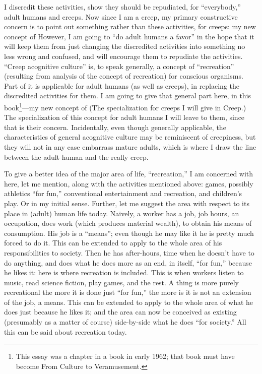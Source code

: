 I discredit these activities, show they should be repudiated, for \enquote{everybody,} adult humans and creeps. Now since I am a creep, my primary constructive concern is to point out something rather than these activities, for creeps: my new concept of  However, I am going to \enquote{do adult humans a favor} in the hope that it will keep them from just changing the discredited activities into something no less wrong and confused, and will encourage them to repudiate the activities. \enquote{Creep acognitive culture} is, to speak generally, a concept of \enquote{recreation} (resulting from analysis of the concept of recreation) for conscious organisms. Part of it is applicable for adult humans (as well as creeps), in replacing the discredited activities for them. I am going to give that general part here, in this book\footnote{This essay was a chapter in a book in early 1962; that book must have become From Culture to Veramusement.}---my new concept of  (The specialization for creeps I will give in Creep.) The specialization of this concept for adult humans I will leave to them, since that is their concern. Incidentally, even though generally applicable, the characteristics of general acognitive culture may be reminiscent of creepiness, but they will not in any case embarrass mature adults, which is where I draw the line between the adult human and the really creep.

To give a better idea of the major area of life, \enquote{recreation,} I am concerned with here, let me mention, along with the activities mentioned above: games, possibly athletics \enquote{for fun,} conventional entertainment and recreation, and children's play. Or  in my initial sense. Further, let me suggest the area with respect to its place in (adult) human life today. Naively, a worker has a job, job hours, an occupation, does work (which produces material wealth), to obtain his means of consumption. His job is a \enquote{means}; even though he may like it he is pretty much forced to do it. This can be extended to apply to the whole area of his responsibilities to society. Then he has after-hours, time when he doesn't have to do anything, and does what he does more as an end, in itself, \enquote{for fun,} because he likes it: here is where recreation is included. This is when workers listen to music, read science fiction, play games, and the rest. A thing is more purely recreational the more it is done just \enquote{for fun,} the more is it is not an extension of the job, a means. This can be extended to apply to the whole area of what he does just because he likes it; and the area can now be conceived as existing (presumably as a matter of course) side-by-side what he does \enquote{for society.} All this can be said about recreation today.

